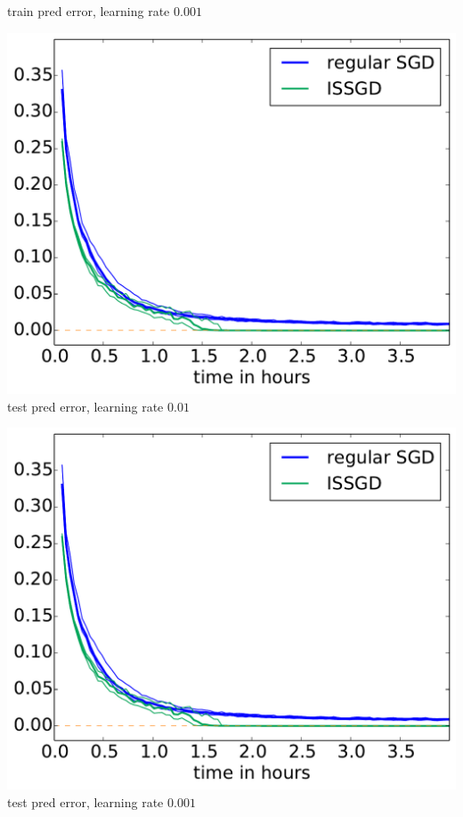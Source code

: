 \documentclass[a0,landscape]{a0poster}
\begin{document}
\begin{textblock}{0}
\begin{minipage}{35cm}
\begin{center}
\begin{minipage}{0.4\textwidth}
    train pred error, learning rate $0.001$
  \end{minipage}
\end{center}
\begin{center}
  \begin{minipage}{0.4\textwidth}
    \center
    \includegraphics[width=\textwidth]{USGD_ISSGD_120_170_loss_train.pdf}
    test pred error, learning rate $0.01$
  \end{minipage}
  \begin{minipage}{0.4\textwidth}
    \center
    \includegraphics[width=\textwidth]{USGD_ISSGD_120_170_loss_train.pdf}
    test pred error, learning rate $0.001$
  \end{minipage}
\end{center}
\end{minipage}
\end{textblock}
\end{document}
